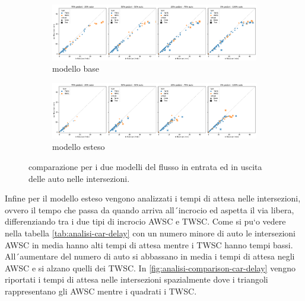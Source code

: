 \begin{figure}[h]
    \centering
    \begin{subfigure}{0.99\textwidth}
        \centering
        \includegraphics[width=\textwidth]{images/analisi/comparison-base-in-out-flow-car.png}
        \caption{modello base}
    \end{subfigure}
    \begin{subfigure}{0.99\textwidth}
        \centering
        \includegraphics[width=\textwidth]{images/analisi/comparison-new-in-out-flow-car.png}
        \caption{modello esteso}
    \end{subfigure}
    \caption{comparazione per i due modelli del flusso in entrata ed in uscita delle auto nelle intersezioni.}
    \label{fig:analisi-comparison-in-out-flow-car}
\end{figure}

\newpage

Infine per il modello esteso vengono analizzati i tempi di attesa nelle intersezioni,
ovvero il tempo che passa da quando arriva all´incrocio ed aspetta
il via libera, differenziando tra i due tipi di incrocio AWSC e TWSC.
Come si pu`o vedere nella tabella \ref*{tab:analisi-car-delay} con un numero minore di auto le intersezioni AWSC 
in media hanno alti tempi di attesa mentre i TWSC hanno tempi bassi.
All´aumentare del numero di auto si abbassano in media i tempi di attesa negli AWSC e si alzano quelli dei TWSC.
In \ref*{fig:analisi-comparison-car-delay} vengno riportati i tempi di attesa nelle intersezioni spazialmente
dove i triangoli rappresentano gli AWSC mentre i quadrati i TWSC.

